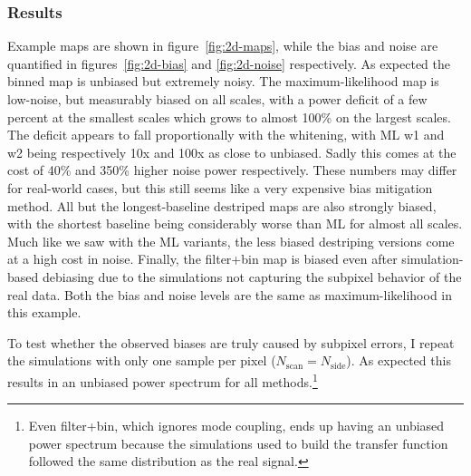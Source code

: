 \documentclass[twocolumn,apj]{aastex63}
\begin{document}
\subsubsection{Results}
\label{sec:2d-results}
Example maps are shown in figure~\ref{fig:2d-maps},
while the bias and noise are quantified in figures~\ref{fig:2d-bias} and \ref{fig:2d-noise}
respectively.
As expected the binned map is unbiased but extremely noisy. The maximum-likelihood
map is low-noise, but measurably biased on all scales, with a power deficit of
a few percent at the smallest scales which grows to almost 100\% on the largest scales.
The deficit appears to fall proportionally with the whitening, with ML w1 and w2
being respectively 10x and 100x as close to unbiased. Sadly this comes at the cost of
40\% and 350\% higher noise power respectively. These numbers may differ for real-world
cases, but this still seems like a very expensive bias mitigation method.
All but the longest-baseline destriped maps are also strongly biased,
with the shortest baseline being considerably worse than ML for almost all scales.
Much like we saw with the ML variants, the less biased destriping versions
come at a high cost in noise. Finally, the filter+bin map is biased even after simulation-based
debiasing due to the simulations not capturing the subpixel behavior of the real data.
Both the bias and noise levels are the same as maximum-likelihood in this example.

To test whether the observed biases are truly caused by subpixel errors, I repeat
the simulations with only one sample per pixel ($N_\text{scan} = N_\text{side}$).
As expected this results in an unbiased power spectrum for all methods.\footnote{
	Even filter+bin, which ignores mode coupling, ends up having an unbiased power
	spectrum because the simulations used to build the transfer function followed
	the same distribution as the real signal.
}
\end{document}
